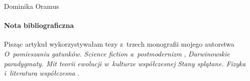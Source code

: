 \begin{artplenv}{Dominika Oramus}
\paragraph{Nota bibliograficzna}
Pisząc artykuł wykorzystywałam tezy z~trzech monografii mojego autorstwa \textit{O~pomieszaniu gatunków. Science fiction a~postmodernizm}
\parencite*[][]{oramus_o_2010}, %
 \textit{Darwinowskie} \textit{paradygmaty. Mit teorii ewolucji w~kulturze współczesnej} 
\parencite*[][]{oramus_darwinowskie_2015} %
 \textit{Stany splątane. Fizyka i~literatura współczesna} 
\parencite*[][]{oramus_stany_2020}.%



\end{artplenv}